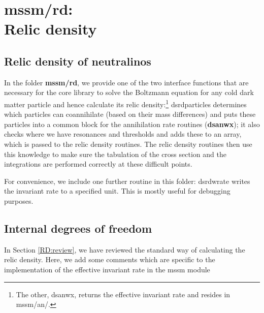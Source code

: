 \documentclass[a4paper,10pt,oneside]{book}
\newcommand{\code}[1]{\ft{#1}}
\newcommand{\codeb}[1]{\ftb{#1}}
\newcommand{\ft}[1]{\textsf{#1}}
\newcommand{\ftb}[1]{{\bfseries \sffamily #1}}
\begin{document}
\section[mssm/rd: Relic density]{\codeb{mssm/rd}:\\ Relic density}
\label{sec:src_models/mssm/rd}


\subsection{Relic density of neutralinos}

In the folder \codeb{mssm/rd}, we provide one of the two interface functions
that are necessary for the \code{core} library to solve the Boltzmann
equation for any cold dark matter particle and hence calculate its
relic density:\footnote{
The other, \code{dsanwx}, returns the effective invariant rate and resides
in \code{mssm/an/}.
}
 \code{dsrdparticles} determines which particles  can coannihilate (based on
    their mass differences) and puts these particles into a common
    block for the annihilation rate routines (\codeb{dsanwx}); 
   it also checks where we have resonances and thresholds and adds
    these to an array, which is passed to the relic density
    routines. The relic density routines then use this knowledge to
    make sure the tabulation of the cross section and the integrations
    are performed correctly at these difficult points.

For convenience, we include one further routine in this folder: \code{dsrdwrate}
writes the invariant rate to a specified unit. This is mostly useful for debugging
purposes. 


\subsection{Internal degrees of freedom}
\label{sec:dof}

In Section \ref{RD:review}, we have reviewed the standard way of calculating the
relic density. Here, we add some comments which are specific to the 
implementation of the effective invariant rate in the \code{mssm} module
\end{document}
